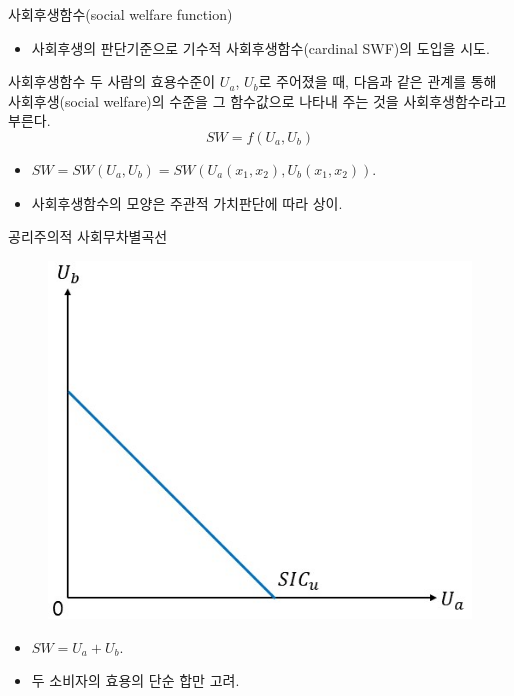 \documentclass[aspectratio=169,xcolor=dvipsnames,handout]{beamer}
\begin{document}
\begin{frame}{사회후생함수(social welfare function)}
    \begin{itemize}
        \item 사회후생의 판단기준으로 기수적 사회후생함수(cardinal SWF)의 도입을 시도.
    \end{itemize}
    \begin{alertblock}{사회후생함수}
        두 사람의 효용수준이 $U_a$, $U_b$로 주어졌을 때, 다음과 같은 관계를 통해 사회후생(social welfare)의 수준을 그 함수값으로 나타내 주는 것을 사회후생함수라고 부른다.
        $$SW = f(U_a, U_b)$$
    \end{alertblock}
    \begin{itemize}
        \item $SW = SW(U_a, U_b)= SW(U_a(x_1,x_2) , U_b(x_1 , x_2))$. 
        \item 사회후생함수의 모양은 주관적 가치판단에 따라 상이.
    \end{itemize}
\end{frame}

\begin{frame}{공리주의적 사회무차별곡선}
    \begin{figure}
        \centering
        \includegraphics[scale=.4]{pic/Utilitarian.jpg}
        \label{fig:Utilitarian}
    \end{figure}
    \begin{itemize}
       \item $SW=U_a + U_b$.
       \item 두 소비자의 효용의 단순 합만 고려.
    \end{itemize}
\end{frame}
\end{document}
